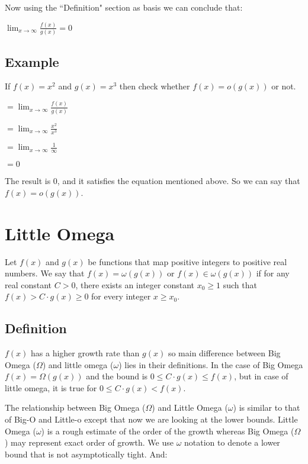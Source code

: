\documentclass[a4paper,12pt]{article}
\theoremstyle{definition}
\begin{document}
    Now using the ``Definition" section as basis we can conclude that:

    \begin{center}
        $\lim_{x \rightarrow \infty}{\frac{f(x)}{g(x)}} = 0$
    \end{center}

    \subsection{Example}

    If $f(x) = x^2$ and $g(x) = x^3$ then check whether $f(x) = o(g(x))$ or not.

    \parindent 8mm
    $= \lim_{x \rightarrow \infty}{\frac{f(x)}{g(x)}}$

    \parindent 8mm
    $= \lim_{x \rightarrow \infty}{\frac{x^2}{x^3}}$

    \parindent 8mm
    $= \lim_{x \rightarrow \infty}{\frac{1}{\infty}}$

    \parindent 8mm
    $= 0$

    \noindent
    The result is $0$, and it satisfies the equation mentioned above. So we can say that $f(x) = o(g(x))$.


    \section{Little Omega}

    Let $f(x)$ and $g(x)$ be functions that map positive integers to positive real numbers.
    We say that $f(x) = \omega(g(x))$ or $f(x) \in \omega(g(x))$ if for any real constant $C > 0$,
    there exists an integer constant $x_0 \geq 1$ such that $f(x) > C \cdot g(x) \geq 0$ for every integer $x \geq x_0$.

    \subsection{Definition}

    $f(x)$ has a higher growth rate than $g(x)$ so main difference between Big Omega ($\Omega$) and little
    omega ($\omega$) lies in their definitions.
    In the case of Big Omega $f(x) = \Omega(g(x))$ and the bound is $0 \leq C \cdot g(x) \leq f(x)$,
    but in case of little omega, it is true for $0 \leq C \cdot g(x) < f(x)$.

    The relationship between Big Omega ($\Omega$) and Little Omega ($\omega$) is similar to that of Big-O and Little-o
    except that now we are looking at the lower bounds.
    Little Omega ($\omega$) is a rough estimate of the order of the growth whereas Big Omega ($\Omega$) may
    represent exact order of growth.
    We use $\omega$ notation to denote a lower bound that is not asymptotically tight.
    And:
\end{document}
